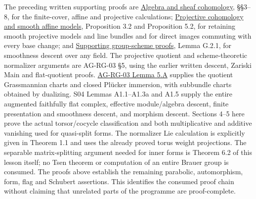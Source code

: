 \documentclass[11pt,a4paper,openany]{report}
\begin{document}
The preceding written supporting proofs are \href{https://github.com/KokunoYumeto/open-math-courses/blob/main/docs/courses/AG-RG/AG-RG-S01.md}{Algebra and sheaf cohomology}, §§3--8, for the finite-cover, affine and projective calculations; \href{https://github.com/KokunoYumeto/open-math-courses/blob/main/docs/courses/AG-RG/AG-RG-S02.md}{Projective cohomology and smooth affine models}, Proposition 3.2 and Proposition 5.2, for retaining smooth projective models and line bundles and for direct images commuting with every base change; and \href{https://github.com/KokunoYumeto/open-math-courses/blob/main/docs/courses/AG-RG/AG-RG-S08.md}{Supporting group-scheme proofs}, Lemma G.2.1, for smoothness descent over any field. The projective quotient and scheme-theoretic normalizer arguments are AG-RG-03 §5, using the earlier written descent, Zariski Main and flat-quotient proofs. \href{https://github.com/KokunoYumeto/open-math-courses/blob/main/docs/courses/AG-RG/AG-RG-03.md\#ag-rg-03-grassmannian}{AG-RG-03 Lemma 5.A} supplies the quotient Grassmannian charts and closed Plücker immersion, with subbundle charts obtained by dualizing. S04 Lemmas A1.1--A1.3a and A1.5 supply the entire augmented faithfully flat complex, effective module/algebra descent, finite presentation and smoothness descent, and morphism descent. Sections 4--5 here prove the actual torsor/cocycle classification and both multiplicative and additive vanishing used for quasi-split forms. The normalizer Lie calculation is explicitly given in Theorem 1.1 and uses the already proved torus weight projections. The separable matrix-splitting argument needed for inner forms is Theorem 6.2 of this lesson itself; no Tsen theorem or computation of an entire Brauer group is consumed. The proofs above establish the remaining parabolic, automorphism, form, flag and Schubert assertions. This identifies the consumed proof chain without claiming that unrelated parts of the programme are proof-complete.
\end{document}
